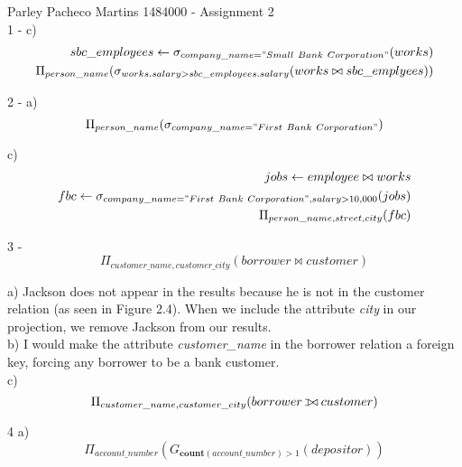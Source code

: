 \documentclass{article}
\def\ojoin{\setbox0=\hbox{$\bowtie$}%
  \rule[-.02ex]{.25em}{.4pt}\llap{\rule[\ht0]{.25em}{.4pt}}}
\def\leftouterjoin{\mathbin{\ojoin\mkern-5.8mu\bowtie}}
\begin{document}
Parley Pacheco Martins 1484000 - Assignment 2 \\

1 - c) 
	\begin{equation}
	\begin{split}
		sbc\_employees \leftarrow \sigma_{company\_name = "Small\ Bank\ Corporation"} (works)\\
		\Pi_{person\_name} (\sigma_{works.salary > sbc\_employees.salary}(works \bowtie sbc\_emplyees))
	\end{split}
	\end{equation}

2 - a)
	\begin{equation}
		\Pi_{person\_name} (\sigma_{company\_name = "First\ Bank\ Corporation"})
	\end{equation}

	c)
	\begin{equation}
	\begin{split}
		jobs \leftarrow employee \bowtie works \\
		fbc \leftarrow \sigma_{company\_name = "First\ Bank\ Corporation", salary > 10,000}(jobs) \\
		\Pi_{person\_name, street, city} (fbc)
	\end{split}
	\end{equation}

3 - \begin{equation}
		\Pi_{customer\_name, customer\_city}(borrower \bowtie customer)
	\end{equation}

a) Jackson does not appear in the results because he is not in the customer relation (as seen in 
Figure 2.4). When we include the attribute \textit{city} in our projection, we remove Jackson from our results. \\

b) I would make the attribute \textit{customer\_name} in the borrower relation a foreign key, forcing any borrower to be a bank customer. \\

c)\begin{equation}
		\Pi_{customer\_name, customer\_city}(borrower \leftouterjoin customer)
	\end{equation} 


4 a)
	\begin{equation}
		\Pi_{account\_number} (G_{\textbf{count}(account\_number) > 1} (depositor))
	\end{equation}
\end{document}
